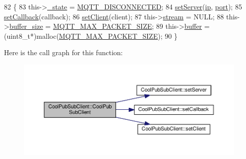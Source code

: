 \begin{DoxyCode}
82                                                                                                       \{
83     this->\hyperlink{class_cool_pub_sub_client_aa1953b601206252a30efa5b114eb3e1a}{\_state} = \hyperlink{_cool_pub_sub_client_8h_adaf86a906a305dd129164982d50111b3}{MQTT\_DISCONNECTED};
84     \hyperlink{class_cool_pub_sub_client_a947e70c394c66c7d08d0c53caf8425e3}{setServer}(\hyperlink{class_cool_pub_sub_client_adabd958c6c3462433a3f3393f40a0966}{ip}, \hyperlink{class_cool_pub_sub_client_a01e3249102c057756af7a515c179844e}{port});
85     \hyperlink{class_cool_pub_sub_client_ac5cab7658f1bdded32131241e468e661}{setCallback}(callback);
86     \hyperlink{class_cool_pub_sub_client_a7ee119b786010561ab6a9afa0798e91d}{setClient}(client);
87     this->\hyperlink{class_cool_pub_sub_client_a7a92417b317e7bd9502ed37752111705}{stream} = NULL;
88     this->\hyperlink{class_cool_pub_sub_client_ae6cb10e42c057483d53516ac830ab526}{buffer\_size} = \hyperlink{_cool_pub_sub_client_8h_ae09b594688a59f1427c7e45259e039b9}{MQTT\_MAX\_PACKET\_SIZE};
89     this->\hyperlink{class_cool_pub_sub_client_a7e8bcc6096626916046a51bebadc7851}{buffer} = (uint8\_t*)malloc(\hyperlink{_cool_pub_sub_client_8h_ae09b594688a59f1427c7e45259e039b9}{MQTT\_MAX\_PACKET\_SIZE});
90 \}
\end{DoxyCode}
Here is the call graph for this function\+:\nopagebreak
\begin{figure}[H]
\begin{center}
\leavevmode
\includegraphics[width=350pt]{d8/d4b/class_cool_pub_sub_client_afc703702b40ba925377d0b9cd401319e_cgraph}
\end{center}
\end{figure}
\mbox{\label{class_cool_pub_sub_client_a08309a2cf058099fa5c96c198f777647}} 
